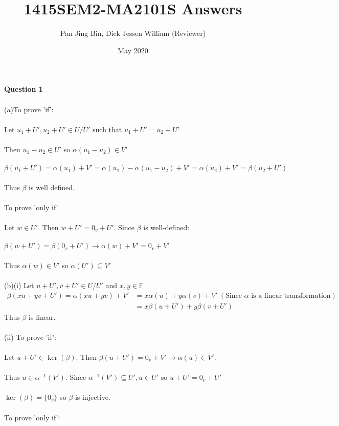 \documentclass{article}
\title{1415SEM2-MA2101S Answers}
\author{Pan Jing Bin, Dick Jessen William (Reviewer)}
\date{May 2020}
\begin{document}
\maketitle
\textbf{Question 1}\\\\
(a)To prove 'if':\\\\
Let $u_1 + U',u_2 + U' \in U/U'$ such that $u_1+U' = u_2+U'$\\\\
Then $u_1-u_2 \in U'$ so $\alpha(u_1-u_2) \in V'$\\\\
$\beta(u_1+U') = \alpha(u_1) + V' = \alpha(u_1) - \alpha(u_1-u_2) + V' = \alpha(u_2) + V' = \beta(u_2 + U')$\\\\
Thus $\beta$ is well defined.\\\\
To prove 'only if'\\\\
Let $w\in U'$. Then $w+U' = 0_v + U'$. Since $\beta$ is well-defined:\\\\
$\beta(w+U') = \beta(0_v + U') \to \alpha(w) + V' = 0_v + V'$\\\\
Thus $\alpha(w) \in V'$ so $\alpha(U')\subseteq V'$\\\\
(b)(i) Let $u+U',v+U'\in U/U'$ and $x,y\in \mathbb{F}$
\begin{align*}
\beta(xu + yv + U') = \alpha(xu+yv) + V'  &= x\alpha(u) + y\alpha(v) + V' \ (\text{Since } \alpha \text{ is a linear transformation})\\ &= x\beta(u+U') + y\beta(v+U')
\end{align*}
Thus $\beta$ is linear.\\\\
(ii) To prove 'if':\\\\
Let $u+U' \in \ker(\beta)$. Then $\beta(u+U') = 0_v + V' \to \alpha(u) \in V'$.\\\\
Thus $u\in\alpha^{-1}(V')$. Since $\alpha^{-1}(V')\subseteq U', u\in U'$ so $u+U' = 0_v + U'$\\\\
$\ker(\beta) = \{0_v\}$ so $\beta$ is injective.\\\\
To prove 'only if':\\\\
\end{document}
